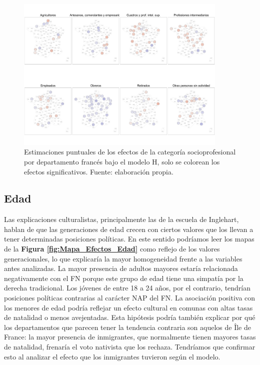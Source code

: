 \begin{figure}[h]
	\centering
	\includegraphics[width = 0.9\textwidth]{Figs/Efectos/Dorling_Efectos_Cat_Socioprof_Modelo_H}
	\caption{Estimaciones puntuales de los efectos de la categoría socioprofesional por departamento francés bajo el modelo H, solo se colorean los efectos significativos. Fuente: elaboración propia.}
	\label{fig:Dorling_Efectos_Cat_Socioprof}
\end{figure}

\subsection{Edad}

Las explicaciones culturalistas, principalmente las de la escuela de Inglehart, hablan de que las generaciones de edad crecen con ciertos valores que los llevan a tener determinadas posiciones políticas. En este sentido podríamos leer los mapas de la \textbf{Figura \ref{fig:Mapa_Efectos_Edad}} como reflejo de los valores generacionales, lo que explicaría la mayor homogeneidad frente a las variables antes analizadas. La mayor presencia de adultos mayores estaría relacionada negativamente con el FN porque este grupo de edad tiene una simpatía por la derecha tradicional. Los jóvenes de entre 18 a 24 años, por el contrario, tendrían posiciones políticas contrarias al carácter NAP del FN. La asociación positiva con los menores de edad podría reflejar un efecto cultural en comunas con altas tasas de natalidad o menos avejentadas. Esta hipótesis podría también explicar por qué los departamentos que parecen tener la tendencia contraria son aquelos de Île de France: la mayor presencia de inmigrantes, que normalmente tienen mayores tasas de natalidad, frenaría el voto nativista que los rechaza. Tendríamos que confirmar esto al analizar el efecto que los inmigrantes tuvieron según el modelo.\\

